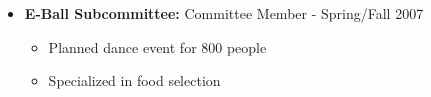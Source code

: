 \documentclass[oneside]{article}
\begin{document}
\begin{itemize}
\item{\bf E-Ball Subcommittee:} Committee Member - Spring/Fall 2007
\begin{itemize}
  \item Planned dance event for 800 people
  \item Specialized in food selection
\end{itemize}


\end{itemize}


%
%
\end{document}
